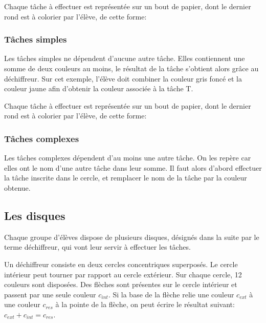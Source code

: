 \documentclass{article}
\begin{document}
Chaque tâche à effectuer est représentée sur un bout de papier, dont le dernier rond est à colorier par l'élève, de cette forme:

\subsubsection{Tâches simples}
\begin{center}
\end{center}
Les tâches simples ne dépendent d'aucune autre tâche. Elles contiennent une somme de deux couleurs au moins, le résultat de la tâche s'obtient alors grâce au déchiffreur. Sur cet exemple, l'élève doit combiner la couleur gris foncé et la couleur jaune afin d'obtenir la couleur associée à la tâche \textsf{T}.

Chaque tâche à effectuer est représentée sur un bout de papier, dont le dernier rond est à colorier par l'élève, de cette forme:


\subsubsection{Tâches complexes}
\begin{center}
\end{center}

Les tâches complexes dépendent d'au moins une autre tâche. On les repère car elles ont le nom d'une autre tâche dans leur somme. Il faut alors d'abord effectuer la tâche inscrite dans le cercle, et remplacer le nom de la tâche par la couleur obtenue. 


\subsection{Les disques}




Chaque groupe d'élèves dispose de plusieurs disques, désignés dans la suite par le terme déchiffreur, qui vont leur servir à effectuer les tâches. 

Un déchiffreur consiste en deux cercles concentriques superposés. Le cercle intérieur peut tourner par rapport au cercle extérieur. Sur chaque cercle, 12 couleurs sont disposées. Des flèches sont présentes sur le cercle intérieur et passent par une seule couleur $c_{int}$. Si la base de la flèche relie une couleur $c_{ext}$ à une couleur $c_{res}$ à la pointe de la flèche, on peut écrire le résultat suivant: $c_{ext} + c_{int} = c_{res}$. 
\end{document}
